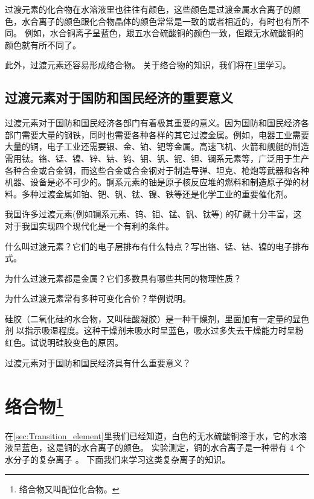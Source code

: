 过渡元素的化合物在水溶液里也往往有颜色，这些颜色是过渡金属水合离子的颜色，水合离子的颜色跟化合物晶体的颜色常常是一致的或者相近的，有时也有所不同。
例如，水合铜离子呈蓝色，跟五水合硫酸铜的颜色一致，但跟无水硫酸铜的颜色就有所不同了。

此外，过渡元素还容易形成络合物。
关于络合物的知识，我们将在\cref{sec:complex}里学习。

\subsection{过渡元素对于国防和国民经济的重要意义}
过渡元素对于国防和国民经济各部门有着极其重要的意义。因为国防和国民经济各部门需要大量的钢铁，同时也需要各种各样的其它过渡金属。例如，电器工业需要大量的铜，电子工业还需要银、金、铂、钯等金属。高速飞机、火箭和舰艇的制造需用钛。铬、锰、镍、锌、钴、钨、钼、钒、铌、钽、镧系元素等，广泛用于生产各种合金或合金钢，而这些合金或合金钢对于制造导弹、坦克、枪炮等武器和各种机器、设备是必不可少的。锕系元素的铀是原子核反应堆的燃料和制造原子弹的材料。多种过渡金属如铂、钯、钒、钛、镍、铁等还是化学工业的重要催化剂。

我国许多过渡元素(例如镧系元素、钨、钼、锰、钒、钛等) 的矿藏十分丰富，这对于我国实现四个现代化是一个有利的条件。

\begin{Practice}[习题]
\begin{question}
  \item 什么叫过渡元素？它们的电子层排布有什么特点？写出铬、锰、钴、镍的电子排布式。
  \item 为什么过渡元素都是金属？它们多数具有哪些共同的物理性质？
  \item 为什么过渡元素常有多种可变化合价？举例说明。
  \item 硅胶（二氧化硅的水合物，又叫硅酸凝胶）是一种干燥剂，里面加有一定量的显色剂  以指示吸湿程度。这种干燥剂未吸水时呈蓝色，吸水过多失去干燥能力时呈粉红色。试说明硅胶变色的原因。
  \item 过渡元素对于国防和国民经济具有什么重要意义？
\end{question}
\end{Practice}

\section[络合物]{络合物\texorpdfstring{\protect\footnote{络合物又叫配位化合物。}}{}}\label{sec:complex}
在\cref{sec:Transition_element}里我们已经知道，白色的无水硫酸铜溶于水，它的水溶液呈蓝色，这是铜的水合离子的颜色。
实验测定，铜的水合离子是一种带有 4 个水分子的复杂离子  。
下面我们来学习这类复杂离子的知识。

